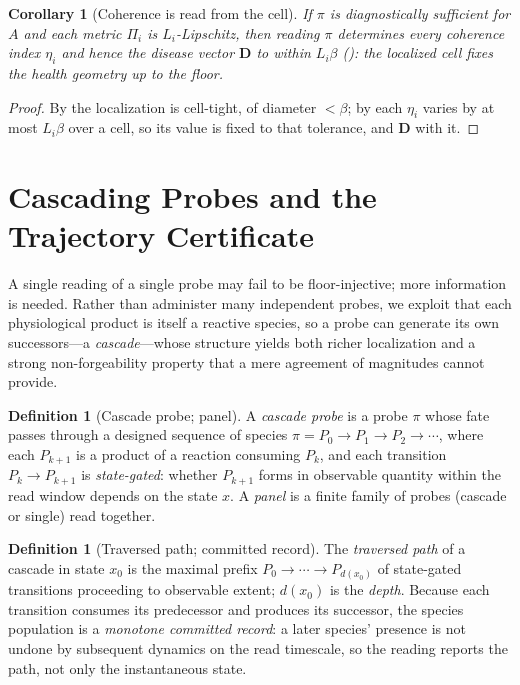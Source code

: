 \documentclass[11pt,a4paper]{article}
\theoremstyle{cfcthm}
\newtheorem{corollary}[theorem]{Corollary}
\theoremstyle{definition}
\newtheorem{definition}[theorem]{Definition}
\theoremstyle{remark}
\newcommand{\st}{x}                     %
\newcommand{\flo}{\beta}                %
\newcommand{\probe}{\pi}                %
\newcommand{\ecoh}{\eta}                %
\newcommand{\dvec}{\mathbf{D}}          %
\begin{document}
\begin{corollary}[Coherence is read from the cell]
\label{cor:coherence-from-cell}
If $\probe$ is diagnostically sufficient for $A$ and each metric $\Pi_i$ is
$L_i$-Lipschitz, then reading $\probe$ determines every coherence index
$\ecoh_i$ and hence the disease vector $\dvec$ to within $L_i\flo$
(): the localized cell fixes the health geometry
up to the floor.
\end{corollary}

\begin{proof}
By  the localization is cell-tight, of diameter $<\flo$;
by  each $\ecoh_i$ varies by at most $L_i\flo$
over a cell, so its value is fixed to that tolerance, and $\dvec$ with it.
\end{proof}

\section{Cascading Probes and the Trajectory Certificate}
\label{sec:cascade}

A single reading of a single probe may fail to be floor-injective; more
information is needed. Rather than administer many independent probes, we
exploit that each physiological product is itself a reactive species, so a
probe can generate its own successors---a \emph{cascade}---whose structure
yields both richer localization and a strong non-forgeability property that a
mere agreement of magnitudes cannot provide.

\begin{definition}[Cascade probe; panel]
\label{def:cascade}
A \emph{cascade probe} is a probe $\probe$ whose fate passes through a designed
sequence of species $\probe=P_0\to P_1\to P_2\to\cdots$, where each $P_{k+1}$
is a product of a reaction consuming $P_k$, and each transition $P_k\to
P_{k+1}$ is \emph{state-gated}: whether $P_{k+1}$ forms in observable quantity
within the read window depends on the state $\st$. A \emph{panel} is a finite
family of probes (cascade or single) read together.
\end{definition}

\begin{definition}[Traversed path; committed record]
\label{def:trajectory}
The \emph{traversed path} of a cascade in state $\st_0$ is the maximal prefix
$P_0\to\cdots\to P_{d(\st_0)}$ of state-gated transitions proceeding to
observable extent; $d(\st_0)$ is the \emph{depth}. Because each transition
consumes its predecessor and produces its successor, the species population is
a \emph{monotone committed record}: a later species' presence is not undone by
subsequent dynamics on the read timescale, so the reading reports the path, not
only the instantaneous state.
\end{definition}
\end{document}
